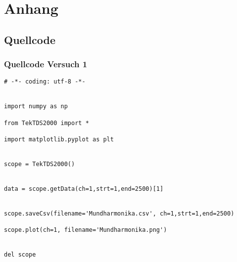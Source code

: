 \documentclass[12pt, oneside, a4paper, \docLanguage]{report}
\begin{document}
%
%
\renewcommand\thesection{A.\arabic{section}}
\renewcommand\thesubsection{\thesection.\arabic{subsection}}

\chapter*{Anhang}
\label{chap:APPENDIX}
\addtocounter{chapter}{1}
\setcounter{section}{0}

\section{Quellcode}
\label{chap:APPENDIX_SOURCECODE}

\subsection{Quellcode Versuch 1}
\label{chap:APPENDIX_SOURCECODE_V1}
\begin{lstlisting}[style=PYTHON, frame=single, caption=Grafik des Mundharmonika-Tons, captionpos=b, label=lst:Mundharmonika]
# -*- coding: utf-8 -*-


import numpy as np

from TekTDS2000 import *

import matplotlib.pyplot as plt


scope = TekTDS2000()


data = scope.getData(ch=1,strt=1,end=2500)[1]


scope.saveCsv(filename='Mundharmonika.csv', ch=1,strt=1,end=2500)

scope.plot(ch=1, filename='Mundharmonika.png')


del scope
\end{lstlisting}
\end{document}
